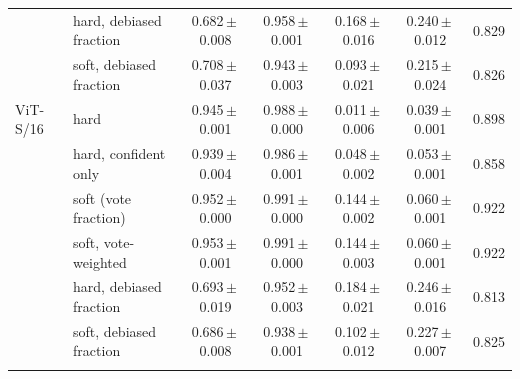 \begin{table}[!htbp]
{\begin{tabular}{llccccc}
 & hard, debiased fraction & 0.682\,$\pm$\,0.008 & 0.958\,$\pm$\,0.001 & 0.168\,$\pm$\,0.016 & 0.240\,$\pm$\,0.012 & 0.829 \\
 & soft, debiased fraction & 0.708\,$\pm$\,0.037 & 0.943\,$\pm$\,0.003 & 0.093\,$\pm$\,0.021 & 0.215\,$\pm$\,0.024 & 0.826 \\
\addlinespace
ViT-S/16 & hard & 0.945\,$\pm$\,0.001 & 0.988\,$\pm$\,0.000 & 0.011\,$\pm$\,0.006 & 0.039\,$\pm$\,0.001 & 0.898 \\
 & hard, confident only & 0.939\,$\pm$\,0.004 & 0.986\,$\pm$\,0.001 & 0.048\,$\pm$\,0.002 & 0.053\,$\pm$\,0.001 & 0.858 \\
 & soft (vote fraction) & 0.952\,$\pm$\,0.000 & 0.991\,$\pm$\,0.000 & 0.144\,$\pm$\,0.002 & 0.060\,$\pm$\,0.001 & 0.922 \\
 & soft, vote-weighted & 0.953\,$\pm$\,0.001 & 0.991\,$\pm$\,0.000 & 0.144\,$\pm$\,0.003 & 0.060\,$\pm$\,0.001 & 0.922 \\
 & hard, debiased fraction & 0.693\,$\pm$\,0.019 & 0.952\,$\pm$\,0.003 & 0.184\,$\pm$\,0.021 & 0.246\,$\pm$\,0.016 & 0.813 \\
 & soft, debiased fraction & 0.686\,$\pm$\,0.008 & 0.938\,$\pm$\,0.001 & 0.102\,$\pm$\,0.012 & 0.227\,$\pm$\,0.007 & 0.825 \\
\addlinespace
\bottomrule
\end{tabular}}
\end{table}
